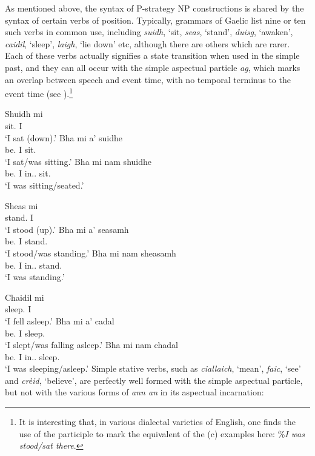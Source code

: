 \documentclass[output=paper]{langsci/langscibook}
\begin{document}
As mentioned above, the syntax of P-strategy NP  constructions is
shared by the syntax of certain verbs of position. Typically, grammars of
Gaelic list nine or ten such verbs in common use, including \emph{suidh}, `sit,
\emph{seas}, `stand', \emph{duisg}, `awaken', \emph{caidil}, `sleep',
\emph{laigh}, `lie down' etc, although there are others which are rarer. Each
of these verbs actually signifies a state transition when used in the simple
past, and they can all occur with the simple aspectual particle \emph{ag},
which marks an overlap between speech and event time, with no temporal terminus
to the event time (see \citealt{adger:96,ramchand:97}).\footnote{It
is interesting that, in various dialectal varieties of English, one finds the
use of the  participle to mark the equivalent of the (c) examples here:
\%\emph{I was stood/sat there}.}

\ea {}
\ea \gll Shuidh mi\\
sit.\Pst{} I\\
\glt \enquote*{I sat (down).}
\ex \gll Bha mi a' suidhe\\
be.\Pst{} I \Simp{} sit.\Vn{}\\
\glt \enquote*{I sat/was sitting.}
\ex \gll Bha mi nam shuidhe\\
be.\Pst{} I in.\Poss.\Fsg{} sit.\Vn{}\\
\glt \enquote*{I was sitting/seated.}
\z
\z

\ea {}
\ea \gll  Sheas mi\\
stand.\Pst{} I\\
\glt \enquote*{I stood (up).}
\ex \gll  Bha mi a' seasamh\\
be.\Pst{} I \Simp{} stand.\Vn{}\\
\glt \enquote*{I stood/was standing.}
\ex \gll  Bha mi nam sheasamh\\
be.\Pst{} I in.\Poss.\Fsg{} stand.\Vn{}\\
\glt \enquote*{I was standing.}\label{nam-sheasamh}
\z
\z

\ea {}
\ea \gll  Chaidil mi\\
sleep.\Pst{} I\\
\glt \enquote*{I fell asleep.}
\ex \gll Bha mi a' cadal\\
be.\Pst{} I \Simp{} sleep.\Vn{}\\
\glt \enquote*{I slept/was falling asleep.}
\ex \gll Bha mi nam chadal\\
be.\Pst{} I in.\Poss.\Fsg{} sleep.\Vn{}\\
\glt \enquote*{I was sleeping/asleep.}
\z
\z
Simple stative verbs, such as \emph{ciallaich}, `mean', \emph{faic}, `see' and
\emph{cr\`eid}, `believe', are perfectly well formed with the simple aspectual
particle, but not with the various forms of \emph{ann an} in its aspectual
incarnation:
\end{document}
